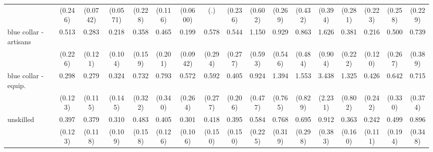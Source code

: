 {\begin{tabular}{l*{16}{c}}
                    &     (0.246)         &    (0.0742)         &    (0.0571)         &     (0.228)         &     (0.116)         &    (0.0600)         &         (.)         &     (0.236)         &     (0.602)         &     (0.269)         &     (0.432)         &     (0.394)         &     (0.281)         &     (0.223)         &     (0.258)         &     (0.229)         \\
[1em]
blue collar - artisans&       0.513         &       0.283\sym{**} &       0.218\sym{**} &       0.358\sym{*}  &       0.465         &       0.199\sym{***}&       0.578         &       0.544         &       1.150         &       0.929         &       0.863         &       1.626         &       0.381         &       0.216\sym{**} &       0.500         &       0.739         \\
                    &     (0.226)         &     (0.121)         &     (0.104)         &     (0.159)         &     (0.201)         &    (0.0942)         &     (0.294)         &     (0.277)         &     (0.593)         &     (0.546)         &     (0.484)         &     (0.904)         &     (0.222)         &     (0.120)         &     (0.267)         &     (0.389)         \\
[1em]
blue collar - equip.&       0.298\sym{**} &       0.279\sym{**} &       0.324\sym{*}  &       0.732         &       0.793         &       0.572         &       0.592         &       0.405         &       0.924         &       1.394         &       1.553         &       3.438         &       1.325         &       0.426         &       0.642         &       0.715         \\
                    &     (0.123)         &     (0.115)         &     (0.145)         &     (0.322)         &     (0.340)         &     (0.264)         &     (0.277)         &     (0.206)         &     (0.477)         &     (0.765)         &     (0.829)         &     (2.231)         &     (0.802)         &     (0.242)         &     (0.330)         &     (0.374)         \\
[1em]
unskilled           &       0.397\sym{**} &       0.379\sym{**} &       0.310\sym{***}&       0.483\sym{*}  &       0.405\sym{**} &       0.301\sym{***}&       0.418\sym{*}  &       0.395\sym{*}  &       0.584         &       0.768         &       0.695         &       0.912         &       0.363\sym{*}  &       0.242\sym{**} &       0.499         &       0.896         \\
                    &     (0.123)         &     (0.118)         &     (0.109)         &     (0.158)         &     (0.126)         &     (0.106)         &     (0.150)         &     (0.150)         &     (0.225)         &     (0.319)         &     (0.298)         &     (0.383)         &     (0.160)         &     (0.111)         &     (0.194)         &     (0.348)         \\

\end{tabular}}
